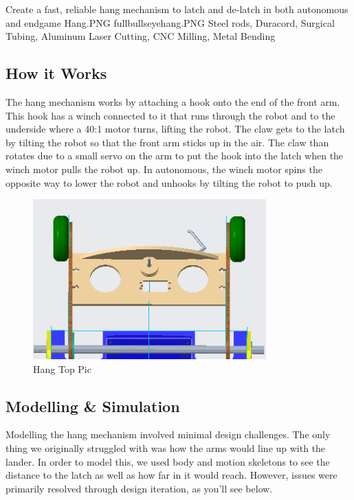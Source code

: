 {Create a fast, reliable hang mechanism to latch and de-latch in both autonomous and endgame} %
{Hang.PNG}%
{fullbullseyehang.PNG}%
{Steel rods, Duracord, Surgical Tubing, Aluminum}%
{Laser Cutting, CNC Milling, Metal Bending}%


\subsection*{How it Works}
The hang mechanism works by attaching a hook onto the end of the front arm. This hook has a winch connected to it that runs through the robot and to the underside where a 40:1 motor turns, lifting the robot. The claw gets to the latch by tilting the robot so that the front arm sticks up in the air. The claw than rotates due to a small servo on the arm to put the hook into the latch when the winch motor pulls the robot up. In autonomous, the winch motor spins the opposite way to lower the robot and unhooks by tilting the robot to push up. 

 \begin{figure}[h!]
 \centering
   \includegraphics[width=0.8\textwidth, angle=0]{Design_Overview/Hang_1.PNG}
  \caption{Hang Top Pic}
  \label{fig:hang_top}
 \end{figure}

\subsection*{Modelling \& Simulation}
Modelling the hang mechanism involved minimal design challenges. The only thing we originally struggled with was how the arms would line up with the lander. In order to model this, we used body and motion skeletons to see the distance to the latch as well as how far in it would reach. However, issues were primarily resolved through design iteration, as you'll see below. 

